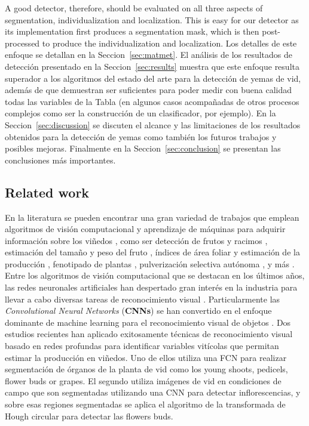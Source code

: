 \documentclass[a4paper,authoryear,review]{elsarticle}
\begin{document}
A good detector, therefore, should be evaluated on all three aspects of segmentation, individualization and localization. This is easy for our detector as its implementation first produces a segmentation mask, which is then post-processed to produce the individualization and localization. Los detalles de este enfoque se  detallan en la Seccion~\ref{sec:matmet}. El análisis de los resultados de detección presentado en la Seccion~\ref{sec:results} muestra que este enfoque resulta superador a los algoritmos del estado del arte para la detección de yemas de vid, además de que demuestran ser suficientes para poder medir con buena calidad todas las variables de la Tabla (en algunos casos acompañadas de otros procesos complejos como ser la construcción de un clasificador, por ejemplo). 
%
En la Seccion~\ref{sec:discussion} se discuten el alcance y las limitaciones de los resultados obtenidos para la detección de yemas como también los futuros trabajos y posibles mejoras. Finalmente en la Seccion~\ref{sec:conclusion} se presentan las conclusiones más importantes.

\subsection{Related work} \label{sec:related}

En la literatura se pueden encontrar una gran variedad de trabajos que emplean algoritmos de visión computacional y aprendizaje de máquinas para adquirir información sobre los viñedos \citep{seng2018computer}, como ser detección de frutos y racimos \citep{nuske2011yield}, estimación del tamaño y peso del fruto \citep{tardaguila2012automatic}, índices de área foliar y estimación de la producción \citep{diago2012grapevine}, fenotipado de plantas \citep{herzog2014initial}, pulverización selectiva autónoma \citep{berenstein2010grape}, y más \citep{tardaguila2012applications, whalley2013applications}. Entre los algoritmos de visión computacional que se destacan en los últimos años, las redes neuronales artificiales han despertado gran interés en la industria para llevar a cabo diversas tareas de reconocimiento visual \citep{hirano2006industry, kahng2017cti, tilgner2019multi}. Particularmente las \emph{Convolutional Neural Networks} (\textbf{CNNs}) se han convertido en el enfoque dominante de machine learning para el reconocimiento visual de objetos \citep{ning2017inception}. Dos estudios recientes han aplicado exitosamente técnicas de reconocimiento visual basado en redes profundas para identificar variables vitícolas que permitan estimar la producción en viñedos. Uno de ellos \citet{grimm2019adaptable} utiliza una FCN para realizar segmentación de órganos de la planta de vid como los young shoots, pedicels, flower buds or grapes. El segundo \citet{rudolph2018efficient} utiliza imágenes de vid en condiciones de campo que son segmentadas utilizando una CNN para detectar inflorescencias, y sobre esas regiones segmentadas se aplica el algoritmo de la transformada de Hough circular para detectar las flowers buds.
\end{document}
